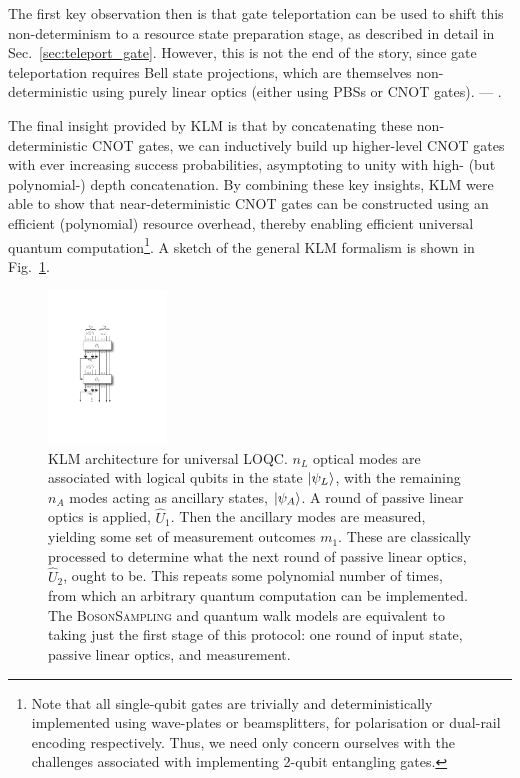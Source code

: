 The first key observation then is that gate teleportation can be used to shift this non-determinism to a resource state preparation stage, as described in detail in Sec.~\ref{sec:teleport_gate}. However, this is not the end of the story, since gate teleportation requires Bell state projections, which are themselves non-deterministic using purely linear optics (either using PBSs or CNOT gates). --- .

The final insight provided by KLM is that by concatenating these non-deterministic CNOT gates, we can inductively build up higher-level CNOT gates with ever increasing success probabilities, asymptoting to unity with high- (but polynomial-) depth concatenation. By combining these key insights, KLM were able to show that near-deterministic CNOT gates can be constructed using an efficient (polynomial) resource overhead, thereby enabling efficient universal quantum computation\footnote{Note that all single-qubit gates are trivially and deterministically implemented using wave-plates or beamsplitters, for polarisation or dual-rail encoding respectively. Thus, we need only concern ourselves with the challenges associated with implementing 2-qubit entangling gates.}. A sketch of the general KLM formalism is shown in Fig.~\ref{fig:KLM_protocol}.

\begin{figure}[htpb]
\includegraphics[width=0.28\textwidth]{KLM}
\caption{KLM architecture for universal LOQC. $n_L$ optical modes are associated with logical qubits in the state $|\psi_L\rangle$, with the remaining $n_A$ modes acting as ancillary states, $|\psi_A\rangle$. A round of passive linear optics is applied, $\hat{U}_1$. Then the ancillary modes are measured, yielding some set of measurement outcomes $m_1$. These are classically processed to determine what the next round of passive linear optics, $\hat{U}_2$, ought to be. This repeats some polynomial number of times, from which an arbitrary quantum computation can be implemented. The \textsc{BosonSampling} and quantum walk models are equivalent to taking just the first stage of this protocol: one round of input state, passive linear optics, and measurement.} \label{fig:KLM_protocol}
\end{figure}

